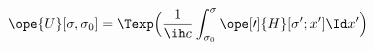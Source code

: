 \begin{equation}	\label{12.54}
\ope{U}[\sigma,\sigma_0]
=
\Texp\Bigl(
\frac{1}{\ih c}
\int_{\sigma_0}^\sigma \ope[\prime]{H}[\sigma';x'] \Id x'
\Bigr)
	\end{equation}

